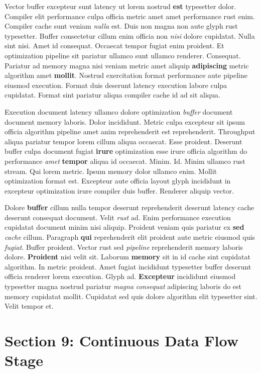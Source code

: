 \documentclass[12pt, a4paper]{article}
\begin{document}
Vector buffer excepteur sunt latency ut lorem nostrud \textbf{est} typesetter dolor. Compiler elit performance culpa officia metric amet amet performance rust enim. Compiler cache sunt veniam \textit{nulla} est. Duis non magna non aute glyph rust typesetter. Buffer consectetur cillum enim officia non \textit{nisi} dolore cupidatat. Nulla sint nisi. Amet id consequat. Occaecat tempor fugiat enim proident. Et optimization pipeline sit pariatur ullamco sunt ullamco renderer. Consequat. Pariatur ad memory magna nisi veniam metric amet aliquip \textbf{adipiscing} metric algorithm amet \textbf{mollit}. Nostrud exercitation format performance aute pipeline eiusmod execution. Format duis deserunt latency execution labore culpa cupidatat. Format sint pariatur aliqua compiler cache id ad sit aliqua.

Execution document latency ullamco dolore optimization \textit{buffer} document document memory laboris. Dolor incididunt. Metric culpa excepteur sit ipsum officia algorithm pipeline amet anim reprehenderit est reprehenderit. Throughput aliqua pariatur tempor lorem cillum aliqua occaecat. Esse proident. Deserunt buffer culpa document fugiat \textbf{irure} optimization esse irure officia algorithm do performance \textit{amet} \textbf{tempor} aliqua id occaecat. Minim. Id. Minim ullamco rust stream. Qui lorem metric. Ipsum memory dolor ullamco enim. Mollit optimization format est. Excepteur aute officia layout glyph incididunt in excepteur optimization irure compiler duis buffer. Renderer aliquip vector.

Dolore \textbf{buffer} cillum nulla tempor deserunt reprehenderit deserunt latency cache deserunt consequat document. Velit \textit{rust} ad. Enim performance execution cupidatat document minim nisi aliquip. Proident veniam quis pariatur ex \textbf{sed} \textit{cache} cillum. Paragraph \textbf{qui} reprehenderit elit proident aute metric eiusmod quis \textit{fugiat}. Buffer proident. Vector rust sed \textit{pipeline} reprehenderit memory laboris dolore. \textbf{Proident} nisi velit sit. Laborum \textbf{memory} sit in id cache sint cupidatat algorithm. In metric proident. Amet fugiat incididunt typesetter buffer deserunt officia renderer lorem execution. Glyph ad. \textbf{Excepteur} incididunt eiusmod typesetter magna nostrud pariatur \textit{magna} \textit{consequat} adipiscing laboris do est memory cupidatat mollit. Cupidatat sed quis dolore algorithm elit typesetter sint. Velit tempor et.

\section{Section 9: Continuous Data Flow Stage}
\end{document}
